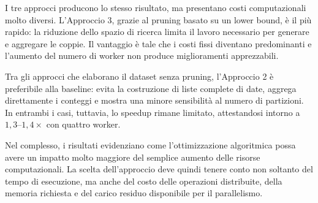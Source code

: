 \documentclass[10pt,a4paper]{article}
\begin{document}
I tre approcci producono lo stesso risultato, ma presentano costi computazionali molto diversi. L'Approccio 3, grazie al pruning basato su un lower bound, è il più rapido: la riduzione dello spazio di ricerca limita il lavoro necessario per generare e aggregare le coppie. Il vantaggio è tale che i costi fissi diventano predominanti e l'aumento del numero di worker non produce miglioramenti apprezzabili.

Tra gli approcci che elaborano il dataset senza pruning, l'Approccio 2 è preferibile alla baseline: evita la costruzione di liste complete di date, aggrega direttamente i conteggi e mostra una minore sensibilità al numero di partizioni. In entrambi i casi, tuttavia, lo speedup rimane limitato, attestandosi intorno a $1{,}3$--$1{,}4\times$ con quattro worker.

Nel complesso, i risultati evidenziano come l'ottimizzazione algoritmica possa avere un impatto molto maggiore del semplice aumento delle risorse computazionali. La scelta dell'approccio deve quindi tenere conto non soltanto del tempo di esecuzione, ma anche del costo delle operazioni distribuite, della memoria richiesta e del carico residuo disponibile per il parallelismo.
\end{document}

